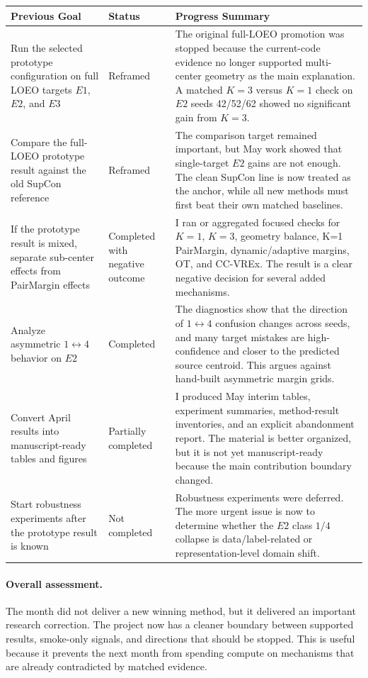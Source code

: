 \documentclass[11pt]{article}
\newcommand{\code}[1]{\texttt{\detokenize{#1}}}
\begin{document}
\begin{longtable}{@{}p{1.65in}p{1.05in}p{3.4in}@{}}
\toprule
Previous Goal & Status & Progress Summary \\
\midrule
\endhead
Run the selected \code{K=3 + PairMargin} prototype configuration on full LOEO targets $E1$, $E2$, and $E3$ & Reframed & The original full-LOEO promotion was stopped because the current-code evidence no longer supported multi-center geometry as the main explanation. A matched $K=3$ versus $K=1$ check on $E2$ seeds 42/52/62 showed no significant gain from $K=3$. \\
Compare the full-LOEO prototype result against the old SupCon reference & Reframed & The comparison target remained important, but May work showed that single-target $E2$ gains are not enough. The clean SupCon line is now treated as the anchor, while all new methods must first beat their own matched baselines. \\
If the prototype result is mixed, separate sub-center effects from PairMargin effects & Completed with negative outcome & I ran or aggregated focused checks for $K=1$, $K=3$, geometry balance, K=1 PairMargin, dynamic/adaptive margins, OT, and CC-VREx. The result is a clear negative decision for several added mechanisms. \\
Analyze asymmetric $1\leftrightarrow4$ behavior on $E2$ & Completed & The diagnostics show that the direction of $1\leftrightarrow4$ confusion changes across seeds, and many target mistakes are high-confidence and closer to the predicted source centroid. This argues against hand-built asymmetric margin grids. \\
Convert April results into manuscript-ready tables and figures & Partially completed & I produced May interim tables, experiment summaries, method-result inventories, and an explicit abandonment report. The material is better organized, but it is not yet manuscript-ready because the main contribution boundary changed. \\
Start robustness experiments after the prototype result is known & Not completed & Robustness experiments were deferred. The more urgent issue is now to determine whether the $E2$ class $1/4$ collapse is data/label-related or representation-level domain shift. \\
\bottomrule
\end{longtable}

\paragraph{Overall assessment.}
The month did not deliver a new winning method, but it delivered an important research correction. The project now has a cleaner boundary between supported results, smoke-only signals, and directions that should be stopped. This is useful because it prevents the next month from spending compute on mechanisms that are already contradicted by matched evidence.
\end{document}
